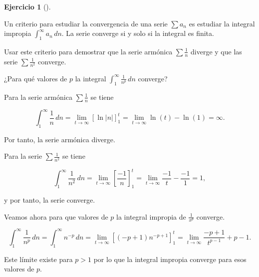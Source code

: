 \documentclass[
  a4paper,
]{scrreport}
\theoremstyle{definition}
\newtheorem{exercise}{Ejercicio}[chapter]
\theoremstyle{remark}
\begin{document}
\begin{exercise}[]\protect\hypertarget{exr-criterio-integral-convergencia-series}{}\label{exr-criterio-integral-convergencia-series}

Un criterio para estudiar la convergencia de una serie \(\sum a_n\) es
estudiar la integral impropia \(\int_1^\infty a_n\,dn\). La serie
converge si y solo si la integral es finita.

Usar este criterio para demostrar que la serie armónica
\(\sum \frac{1}{n}\) diverge y que las serie \(\sum \frac{1}{n^2}\)
converge.

¿Para qué valores de \(p\) la integral
\(\int_1^\infty \frac{1}{n^p}\,dn\) converge?

\end{exercise}

\begin{tcolorbox}[enhanced jigsaw, colframe=quarto-callout-tip-color-frame, colbacktitle=quarto-callout-tip-color!10!white, opacitybacktitle=0.6, left=2mm, toptitle=1mm, coltitle=black, title=\textcolor{quarto-callout-tip-color}{\faLightbulb}\hspace{0.5em}{Solución}, leftrule=.75mm, opacityback=0, toprule=.15mm, colback=white, titlerule=0mm, arc=.35mm, rightrule=.15mm, bottomrule=.15mm, breakable, bottomtitle=1mm]

Para la serie armónica \(\sum \frac{1}{n}\) se tiene

\[
\int_1^\infty \frac{1}{n}\,dn = \lim_{t\to\infty}\left[\ln|n|\right]_1^t = \lim_{t\to\infty}\ln(t) - \ln(1)= \infty.
\]

Por tanto, la serie armónica diverge.

Para la serie \(\sum \frac{1}{n^2}\) se tiene

\[
\int_1^\infty \frac{1}{n^2}\,dn = \lim_{t\to\infty} \left[\frac{-1}{n}\right]_1^t = \lim_{t\to\infty}\frac{-1}{t}-\frac{-1}{1}= 1,
\]

y por tanto, la serie converge.

Veamos ahora para que valores de \(p\) la integral impropia de
\(\frac{1}{x^p}\) converge.

\[
\int_1^\infty \frac{1}{n^p}\,dn = \int_1^\infty n^{-p}\,dn = \lim_{t\to\infty} \left[(-p+1)n^{-p+1}\right]_1^t = \lim_{t\to\infty}\frac{-p+1}{t^{p-1}}+p-1.
\]

Este límite existe para \(p>1\) por lo que la integral impropia converge
para esos valores de \(p\).

\end{tcolorbox}
\end{document}
